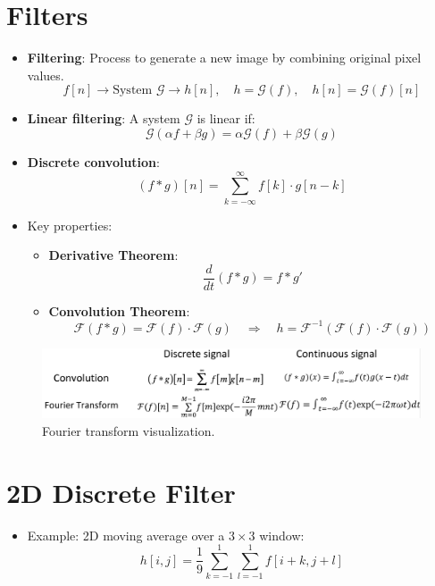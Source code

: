 \clearpage

\section{Filters}
\begin{itemize}
    \item \textbf{Filtering}: Process to generate a new image by combining original pixel values.
    $$
    f[n] \rightarrow \text{System } \mathcal{G} \rightarrow h[n], \quad h = \mathcal{G}(f), \quad h[n] = \mathcal{G}(f)[n]
    $$
    \item \textbf{Linear filtering}: A system $ \mathcal{G} $ is linear if:
    $$
    \mathcal{G}(\alpha f + \beta g) = \alpha \mathcal{G}(f) + \beta \mathcal{G}(g)
    $$
    \item \textbf{Discrete convolution}:
    $$
    (f * g)[n] = \sum_{k=-\infty}^{\infty} f[k] \cdot g[n - k]
    $$
    \item Key properties:
    \begin{itemize}
        \item \textbf{Derivative Theorem}: $$\frac{d}{dt}(f * g) = f * g'$$
        \item \textbf{Convolution Theorem}: 
        $$
        \mathcal{F}(f * g) = \mathcal{F}(f) \cdot \mathcal{F}(g) \quad \Rightarrow \quad h = \mathcal{F}^{-1}(\mathcal{F}(f) \cdot \mathcal{F}(g))
        $$
    \end{itemize}
\end{itemize}

\begin{figure}[htbp]
    \centering
    \includegraphics[scale=0.18]{figures/FourierTransform.png}
    \caption{Fourier transform visualization.}
\end{figure}

\clearpage

\section{2D Discrete Filter}
\begin{itemize}
    \item Example: 2D moving average over a $ 3 \times 3 $ window:
    $$
    h[i,j] = \frac{1}{9} \sum_{k=-1}^{1} \sum_{l=-1}^{1} f[i+k, j+l]
    $$
\end{itemize}

